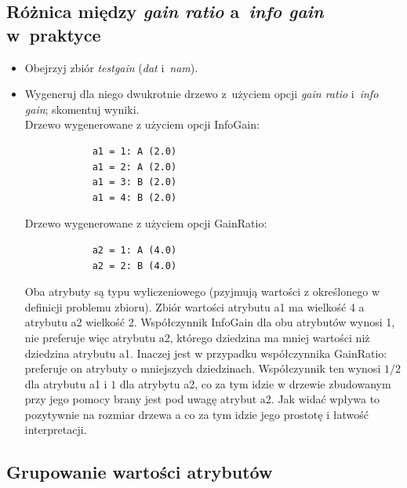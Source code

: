 \subsection{Różnica między \emph{gain ratio} a~\emph{info gain} w~praktyce}

\begin{itemize}
\item Obejrzyj zbiór \emph{testgain} (\emph{dat} i~\emph{nam}).
\item Wygeneruj dla niego dwukrotnie drzewo z~użyciem opcji \emph{gain ratio} i~\emph{info gain}; skomentuj wyniki.
	\\

	Drzewo wygenerowane z użyciem opcji InfoGain:		
		\begin{verbatim}
			a1 = 1: A (2.0)
			a1 = 2: A (2.0)
			a1 = 3: B (2.0)
			a1 = 4: B (2.0)	
		\end{verbatim}


	Drzewo wygenerowane z użyciem opcji GainRatio:
		\begin{verbatim}
			a2 = 1: A (4.0)
			a2 = 2: B (4.0)
		\end{verbatim}

	Oba atrybuty są typu wyliczeniowego (pzyjmują wartości z określonego w definicji problemu zbioru). Zbiór wartości atrybutu a1 ma wielkość 4 a atrybutu a2 wielkość 2. Współczynnik InfoGain dla obu atrybutów wynosi 1, nie preferuje więc atrybutu a2, którego dziedzina ma mniej  wartości niż dziedzina atrybutu a1. Inaczej jest w przypadku współczynnika GainRatio:  preferuje on atrybuty o mniejszych dziedzinach. Współczynnik ten wynosi $ 1/2  $ dla atrybutu a1 i $ 1 $ dla atrybytu a2, co za tym idzie w drzewie zbudowanym przy jego pomocy brany jest pod uwagę atrybut a2. Jak widać wpływa to pozytywnie na rozmiar drzewa a co za tym idzie jego prostotę i łatwość interpretacji.

	
\end{itemize}

\subsection{Grupowanie wartości atrybutów}

